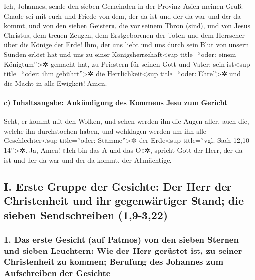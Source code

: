  Ich, Johannes, sende den sieben Gemeinden in der Provinz
Asien meinen Gruß: Gnade sei mit euch und Friede von dem, der da ist und
der da war und der da kommt, und von den sieben Geistern, die vor seinem
Thron (sind),  und von Jesus Christus, dem treuen Zeugen,
dem Erstgeborenen der Toten und dem Herrscher über die Könige der Erde!
Ihm, der uns liebt und uns durch sein Blut von unsern Sünden erlöst hat
 und uns zu einer Königsherrschaft\textless sup
title=``oder: einem Königtum''\textgreater✲ gemacht hat, zu Priestern
für seinen Gott und Vater: sein ist\textless sup title=``oder: ihm
gebührt''\textgreater✲ die Herrlichkeit\textless sup title=``oder:
Ehre''\textgreater✲ und die Macht in alle Ewigkeit! Amen.

\hypertarget{c-inhaltsangabe-ankuxfcndigung-des-kommens-jesu-zum-gericht}{%
\paragraph{c) Inhaltsangabe: Ankündigung des Kommens Jesu zum
Gericht}\label{c-inhaltsangabe-ankuxfcndigung-des-kommens-jesu-zum-gericht}}

 Seht, er kommt mit den Wolken, und sehen werden ihn die
Augen aller, auch die, welche ihn durchstochen haben, und wehklagen
werden um ihn alle Geschlechter\textless sup title=``oder:
Stämme''\textgreater✲ der Erde\textless sup title=``vgl. Sach
12,10-14''\textgreater✲. Ja, Amen!  »Ich bin das A und das
O«✲, spricht Gott der Herr, der da ist und der da war und der da kommt,
der Allmächtige.

\hypertarget{i.-erste-gruppe-der-gesichte-der-herr-der-christenheit-und-ihr-gegenwuxe4rtiger-stand-die-sieben-sendschreiben-19-322}{%
\subsection{I. Erste Gruppe der Gesichte: Der Herr der Christenheit und
ihr gegenwärtiger Stand; die sieben Sendschreiben
(1,9-3,22)}\label{i.-erste-gruppe-der-gesichte-der-herr-der-christenheit-und-ihr-gegenwuxe4rtiger-stand-die-sieben-sendschreiben-19-322}}

\hypertarget{das-erste-gesicht-auf-patmos-von-den-sieben-sternen-und-sieben-leuchtern-wie-der-herr-geruxfcstet-ist-zu-seiner-christenheit-zu-kommen-berufung-des-johannes-zum-aufschreiben-der-gesichte}{%
\subsubsection{1. Das erste Gesicht (auf Patmos) von den sieben Sternen
und sieben Leuchtern: Wie der Herr gerüstet ist, zu seiner Christenheit
zu kommen; Berufung des Johannes zum Aufschreiben der
Gesichte}\label{das-erste-gesicht-auf-patmos-von-den-sieben-sternen-und-sieben-leuchtern-wie-der-herr-geruxfcstet-ist-zu-seiner-christenheit-zu-kommen-berufung-des-johannes-zum-aufschreiben-der-gesichte}}

